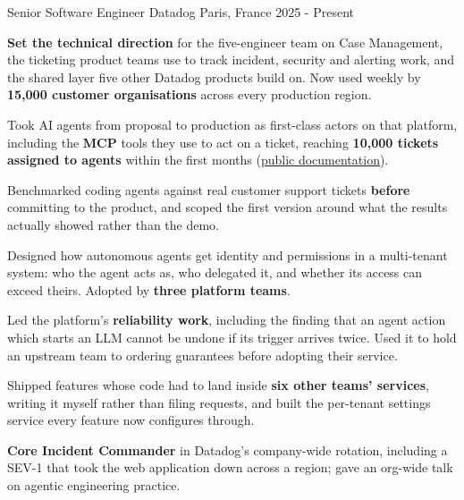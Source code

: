 

\begin{cventries}

  \cventry
    {Senior Software Engineer} %
    {Datadog} %
    {Paris, France} %
    {2025 - Present} %
    {
      \begin{cvitems} %
        \item {\textbf{Set the technical direction} for the five-engineer team on Case Management, the ticketing product teams use to track incident, security and alerting work, and the shared layer five other Datadog products build on. Now used weekly by \textbf{15,000 customer organisations} across every production region.}
        \item {Took AI agents from proposal to production as first-class actors on that platform, including the \textbf{MCP} tools they use to act on a ticket, reaching \textbf{10,000 tickets assigned to agents} within the first months (\href{https://docs.datadoghq.com/incident_response/case_management/ai/custom_agents/}{public documentation}).}
        \item {Benchmarked coding agents against real customer support tickets \textbf{before} committing to the product, and scoped the first version around what the results actually showed rather than the demo.}
        \item {Designed how autonomous agents get identity and permissions in a multi-tenant system: who the agent acts as, who delegated it, and whether its access can exceed theirs. Adopted by \textbf{three platform teams}.}
        \item {Led the platform's \textbf{reliability work}, including the finding that an agent action which starts an LLM cannot be undone if its trigger arrives twice. Used it to hold an upstream team to ordering guarantees before adopting their service.}
        \item {Shipped features whose code had to land inside \textbf{six other teams' services}, writing it myself rather than filing requests, and built the per-tenant settings service every feature now configures through.}
        \item {\textbf{Core Incident Commander} in Datadog's company-wide rotation, including a SEV-1 that took the web application down across a region; gave an org-wide talk on agentic engineering practice.}
      \end{cvitems}
    }


\end{cventries}
